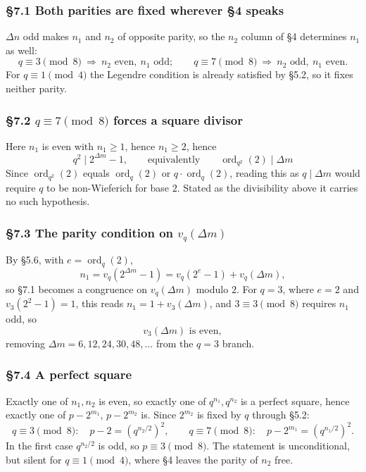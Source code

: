 \documentclass[11pt]{article}
\begin{document}
\subsubsection*{\S7.1 Both parities are fixed wherever \S4 speaks}

$\Delta n$ odd makes $n_1$ and $n_2$ of opposite parity, so the $n_2$ column of \S4 determines $n_1$ as well:
\[
q \equiv 3 \!\!\pmod 8 \ \Rightarrow\ n_2 \text{ even},\ n_1 \text{ odd}; \qquad
q \equiv 7 \!\!\pmod 8 \ \Rightarrow\ n_2 \text{ odd},\ n_1 \text{ even}.
\]
For $q \equiv 1 \pmod 4$ the Legendre condition is already satisfied by \S5.2, so it fixes neither parity.

\subsubsection*{\S7.2 $q \equiv 7 \pmod 8$ forces a square divisor}

Here $n_1$ is even with $n_1 \geq 1$, hence $n_1 \geq 2$, hence
\[
\boxed{\,q^{2} \mid 2^{\Delta m}-1, \qquad\text{equivalently}\qquad \operatorname{ord}_{q^{2}}(2) \mid \Delta m\,}
\]
Since $\operatorname{ord}_{q^2}(2)$ equals $\operatorname{ord}_q(2)$ or $q\cdot\operatorname{ord}_q(2)$, reading this as $q \mid \Delta m$ would require $q$ to be non-Wieferich for base $2$. Stated as the divisibility above it carries no such hypothesis.

\subsubsection*{\S7.3 The parity condition on $v_q(\Delta m)$}

By \S5.6, with $e = \operatorname{ord}_q(2)$,
\[
n_1 = v_q\!\left(2^{\Delta m}-1\right) = v_q\!\left(2^{e}-1\right) + v_q(\Delta m),
\]
so \S7.1 becomes a congruence on $v_q(\Delta m)$ modulo $2$. For $q = 3$, where $e = 2$ and $v_3\!\left(2^2-1\right) = 1$, this reads $n_1 = 1 + v_3(\Delta m)$, and $3 \equiv 3 \pmod 8$ requires $n_1$ odd, so
\[
v_3(\Delta m) \text{ is even},
\]
removing $\Delta m = 6, 12, 24, 30, 48, \dots$ from the $q = 3$ branch.

\subsubsection*{\S7.4 A perfect square}

Exactly one of $n_1, n_2$ is even, so exactly one of $q^{n_1}, q^{n_2}$ is a perfect square, hence exactly one of $p - 2^{m_1}$, $p - 2^{m_2}$ is. Since $2^{m_2}$ is fixed by $q$ through \S5.2:
\[
q \equiv 3 \!\!\pmod 8: \quad p - 2 = \left(q^{n_2/2}\right)^{2}, \qquad
q \equiv 7 \!\!\pmod 8: \quad p - 2^{m_1} = \left(q^{n_1/2}\right)^{2}.
\]
In the first case $q^{n_2/2}$ is odd, so $p \equiv 3 \pmod 8$. The statement is unconditional, but silent for $q \equiv 1 \pmod 4$, where \S4 leaves the parity of $n_2$ free.
\end{document}

